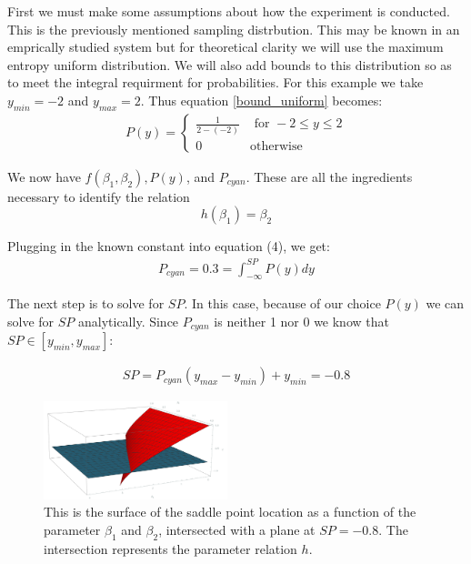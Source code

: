 \documentclass[letterpaper]{article}
\begin{document}
First we must make some assumptions
about how the experiment is conducted. This is the previously mentioned 
sampling distrbution.
This may be known in an emprically studied system but for theoretical 
clarity we will use the maximum entropy uniform distribution. We will also add
bounds to this distribution so as to meet the integral requirment for 
probabilities. For this example we take $y_{min} = -2$ and $y_{max} = 2$.
Thus equation \ref{bound_uniform} becomes:
\begin{eqnarray}
  \label{p_cubic}
    P(y) = \begin{cases}
        \frac{1}{2 - (-2)} & \text{ for } -2\leq y\leq 2\\
        0 & \text{otherwise}
    \end{cases}
\end{eqnarray}

We now have $f(\beta_1,\beta_2), P(y)$, and $P_{cyan}$. These are all the 
ingredients necessary to identify the relation 
\[h(\beta_1) = \beta_2\]

Plugging in the known constant into equation (4), we get:
\begin{eqnarray}
  P_{cyan} = 0.3 = \int_{-\infty}^{SP} P(y)dy
\end{eqnarray}

The next step is to solve for $SP$. In this case, because of our choice $P(y)$
we can solve for $SP$ analytically. Since $P_{cyan}$ is neither 1 nor 0 we know 
that $SP \in [y_{min},y_{max}]$:

\begin{eqnarray}
  SP = P_{cyan}(y_{max}-y_{min}) + y_{min} = -0.8
\end{eqnarray}

\begin{figure}[t]
\begin{center}
\includegraphics[width=2.1in,angle=0]{./cubic_h.png}
\caption{This is the surface of the saddle point location as a function of
the parameter $\beta_1$ and $\beta_2$, intersected with a plane at $SP=-0.8$.
The intersection represents the parameter relation $h$.}
\label{cubic_h}
\end{center}
\end{figure}
\end{document}
